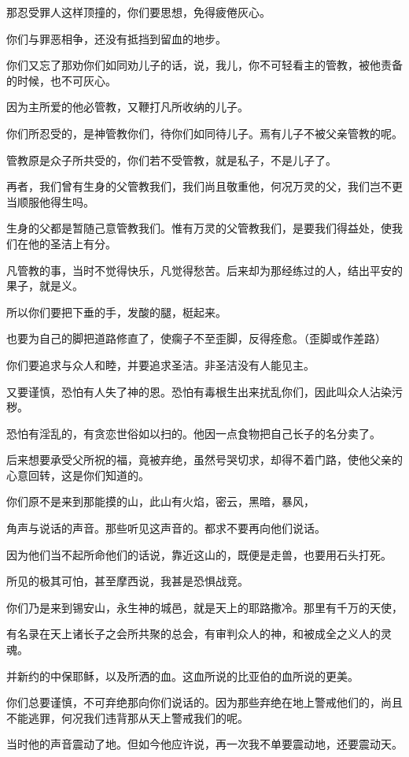 \documentclass[12pt,oneside]{book}
\begin{document}
那忍受罪人这样顶撞的，你们要思想，免得疲倦灰心。

你们与罪恶相争，还没有抵挡到留血的地步。

你们又忘了那劝你们如同劝儿子的话，说，我儿，你不可轻看主的管教，被他责备的时候，也不可灰心。

因为主所爱的他必管教，又鞭打凡所收纳的儿子。

你们所忍受的，是神管教你们，待你们如同待儿子。焉有儿子不被父亲管教的呢。

管教原是众子所共受的，你们若不受管教，就是私子，不是儿子了。

再者，我们曾有生身的父管教我们，我们尚且敬重他，何况万灵的父，我们岂不更当顺服他得生吗。

生身的父都是暂随己意管教我们。惟有万灵的父管教我们，是要我们得益处，使我们在他的圣洁上有分。

凡管教的事，当时不觉得快乐，凡觉得愁苦。后来却为那经练过的人，结出平安的果子，就是义。

所以你们要把下垂的手，发酸的腿，梃起来。

也要为自己的脚把道路修直了，使瘸子不至歪脚，反得痊愈。（歪脚或作差路）

你们要追求与众人和睦，并要追求圣洁。非圣洁没有人能见主。

又要谨慎，恐怕有人失了神的恩。恐怕有毒根生出来扰乱你们，因此叫众人沾染污秽。

恐怕有淫乱的，有贪恋世俗如以扫的。他因一点食物把自己长子的名分卖了。

后来想要承受父所祝的福，竟被弃绝，虽然号哭切求，却得不着门路，使他父亲的心意回转，这是你们知道的。

你们原不是来到那能摸的山，此山有火焰，密云，黑暗，暴风，

角声与说话的声音。那些听见这声音的。都求不要再向他们说话。

因为他们当不起所命他们的话说，靠近这山的，既便是走兽，也要用石头打死。

所见的极其可怕，甚至摩西说，我甚是恐惧战竞。

你们乃是来到锡安山，永生神的城邑，就是天上的耶路撒冷。那里有千万的天使，

有名录在天上诸长子之会所共聚的总会，有审判众人的神，和被成全之义人的灵魂。

并新约的中保耶稣，以及所洒的血。这血所说的比亚伯的血所说的更美。

你们总要谨慎，不可弃绝那向你们说话的。因为那些弃绝在地上警戒他们的，尚且不能逃罪，何况我们违背那从天上警戒我们的呢。

当时他的声音震动了地。但如今他应许说，再一次我不单要震动地，还要震动天。
\end{document}
